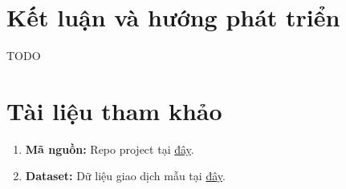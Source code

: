 \documentclass[12pt]{ai_conquer2026}
\begin{document}
\section{Kết luận và hướng phát triển}
TODO

\section{Tài liệu tham khảo}
\label{section:references}
\nocite{*}        %
\printbibliography

\begin{appendices}
\begin{enumerate}
    \item \textbf{Mã nguồn:} Repo project tại \href{https://github.com/}{đây}. %
    \item \textbf{Dataset:} Dữ liệu giao dịch mẫu tại \href{https://aivietnam.edu.vn/}{đây}. %
\end{enumerate}
\end{appendices}
\end{document}
